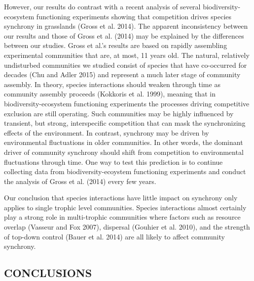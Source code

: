 \documentclass[12pt,]{article}
\begin{document}
However, our results do contrast with a recent analysis of several
biodiversity-ecosystem functioning experiments showing that competition
drives species synchrony in grasslands (Gross et al. 2014). The apparent
inconsistency between our results and those of Gross et al. (2014) may
be explained by the differences between our studies. Gross et al.'s
results are based on rapidly assembling experimental communities that
are, at most, 11 years old. The natural, relatively undisturbed
communities we studied consist of species that have co-occurred for
decades (Chu and Adler 2015) and represent a much later stage of
community assembly. In theory, species interactions should weaken
through time as community assembly proceeds (Kokkoris et al. 1999),
meaning that in biodiversity-ecosystem functioning experiments the
processes driving competitive exclusion are still operating. Such
communities may be highly influenced by transient, but strong,
interspecific competition that can mask the synchronizing effects of the
environment. In contrast, synchrony may be driven by environmental
fluctuations in older communities. In other words, the dominant driver
of community synchrony should shift from competition to environmental
fluctuations through time. One way to test this prediction is to
continue collecting data from biodiversity-ecoystem functioning
experiments and conduct the analysis of Gross et al. (2014) every few
years.

Our conclusion that species interactions have little impact on synchrony
only applies to single trophic level communities. Species interactions
almost certainly play a strong role in multi-trophic communities where
factors such as resource overlap (Vasseur and Fox 2007), dispersal
(Gouhier et al. 2010), and the strength of top-down control (Bauer et
al. 2014) are all likely to affect community synchrony.

\subsection{CONCLUSIONS}\label{conclusions}
\end{document}
